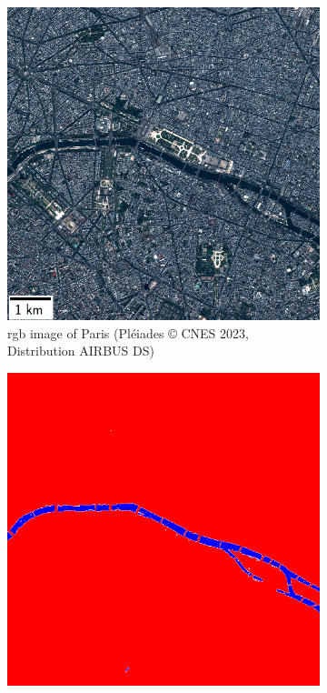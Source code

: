 \begin{figure}
    \centering
    \begin{subfigure}[t]{0.48\linewidth}
        \flushleft
        \includegraphics[width=\linewidth]{Images/Chap_6/miniature_Paris.png}
        \caption{\acrshort{rgb} image of Paris (Pléiades © CNES 2023, Distribution AIRBUS DS)}
        \label{fig:paris_watermask_1}
    \end{subfigure}\hfill
    \begin{subfigure}[t]{0.48\linewidth}
        \flushright
        \includegraphics[width=\linewidth]{Images/Chap_6/watermask_Paris.png}

\end{subfigure}
\end{figure}
